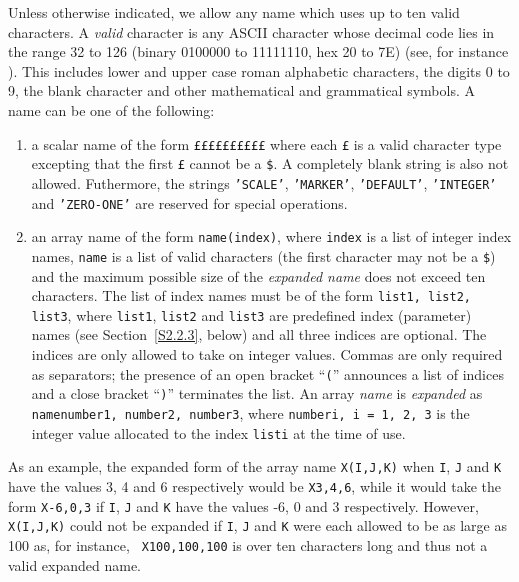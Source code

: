 \documentclass[a4paper]{article}
\begin{document}
Unless otherwise indicated, we  allow any name which   uses up  to ten
valid characters. A {\em valid} character is any ASCII character
whose decimal  code lies in  the range  32  to  126 (binary 0100000 to
11111110, hex  20 to 7E) (see, for  instance \cite{DictComp83}).  This
includes lower and upper case roman alphabetic characters, the digits 0
to 9,  the blank
character   and  other mathematical  and  grammatical
symbols.  A name can be one of the following:
\begin{enumerate}
\item
a  scalar name
of the form
{\tt \pounds\pounds\pounds\pounds\pounds\pounds\pounds\pounds\pounds\pounds}
where each {\tt \pounds} is a valid character type excepting that the
first {\tt \pounds}  cannot be a {\tt \$}. A  completely blank
string is
also not allowed.  Futhermore, the strings {\tt 'SCALE'}, {\tt 'MARKER'},
{\tt 'DEFAULT'}, {\tt 'INTEGER'} and {\tt 'ZERO-ONE'}
are reserved for special operations.
\item
an array name  of  the form {\tt name(index)}, where  {\tt index} is a
list of integer index names,
{\tt name} is a list  of valid characters
(the first character may  not be a {\tt \$})  and the maximum possible
size of the {\em  expanded name} does  not exceed  ten characters. The
list of  index names  must be of the  form  {\tt list1, list2, list3},
where {\tt list1}, {\tt  list2} and {\tt  list3} are  predefined index
(parameter)
names (see   Section~\ref{S2.2.3},  below) and all  three
indices are optional. The indices are only allowed to  take on integer
values. Commas are  only required  as separators; the  presence  of an
open bracket ``{\tt (}'' announces  a list of  indices and  a  close bracket
``{\tt )}''  terminates the list. An array  {\em name} is {\em  expanded} as
{\tt namenumber1, number2, number3}, where {\tt numberi,  i = 1, 2, 3}
is the integer value allocated to the index {\tt listi} at the time of
use.
\end{enumerate}

As an example, the expanded form of the array name {\tt X(I,J,K)} when
{\tt I}, {\tt J} and {\tt K} have the  values 3, 4 and  6 respectively
would be {\tt X3,4,6}, while it would take the form {\tt  X-6,0,3} if
{\tt I}, {\tt J} and {\tt K} have the values -6, 0 and 3 respectively.
However, {\tt X(I,J,K)} could not be expanded if  {\tt I}, {\tt J} and
{\tt K} were each allowed to be as large as 100 as, for instance, {\tt
X100,100,100}    is over ten characters  long   and thus  not  a valid
expanded name.
\end{document}
